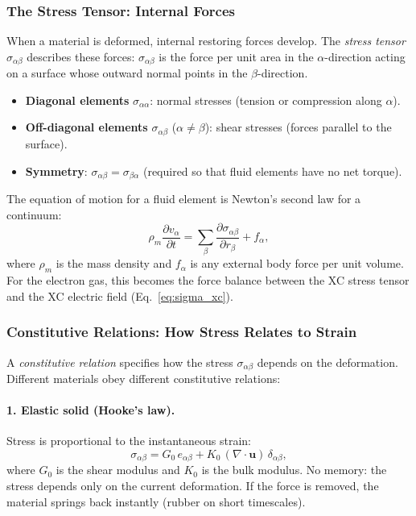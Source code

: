 \documentclass[12pt,letterpaper]{article}
\theoremstyle{definition}
\begin{document}
\subsubsection{The Stress Tensor: Internal Forces}

When a material is deformed, internal restoring forces develop.
The \emph{stress tensor} $\sigma_{\alpha\beta}$ describes these forces:
$\sigma_{\alpha\beta}$ is the force per unit area in the $\alpha$-direction
acting on a surface whose outward normal points in the $\beta$-direction.

\begin{itemize}
  \item \textbf{Diagonal elements} $\sigma_{\alpha\alpha}$: normal stresses
    (tension or compression along $\alpha$).
  \item \textbf{Off-diagonal elements} $\sigma_{\alpha\beta}$ ($\alpha\neq\beta$):
    shear stresses (forces parallel to the surface).
  \item \textbf{Symmetry}: $\sigma_{\alpha\beta} = \sigma_{\beta\alpha}$
    (required so that fluid elements have no net torque).
\end{itemize}

The equation of motion for a fluid element is Newton's second law
for a continuum:
\begin{equation}
  \rho_m \frac{\partial v_\alpha}{\partial t}
  = \sum_\beta\frac{\partial\sigma_{\alpha\beta}}{\partial r_\beta} + f_\alpha,
  \label{eq:newton_fluid}
\end{equation}
where $\rho_m$ is the mass density and $f_\alpha$ is any external body
force per unit volume.  For the electron gas, this becomes the force
balance between the XC stress tensor and the XC electric field
(Eq.~\ref{eq:sigma_xc}).

\subsubsection{Constitutive Relations: How Stress Relates to Strain}
\label{sec:constitutive}

A \emph{constitutive relation} specifies how the stress $\sigma_{\alpha\beta}$
depends on the deformation.  Different materials obey different constitutive
relations:

\paragraph{1. Elastic solid (Hooke's law).}
Stress is proportional to the instantaneous strain:
\begin{equation}
  \sigma_{\alpha\beta} = G_0\,e_{\alpha\beta}
  + K_0\,(\nabla\cdot\bm{u})\,\delta_{\alpha\beta},
  \label{eq:hookes_law}
\end{equation}
where $G_0$ is the shear modulus and $K_0$ is the bulk modulus.
No memory: the stress depends only on the current deformation.
If the force is removed, the material springs back instantly (rubber
on short timescales).
\end{document}
